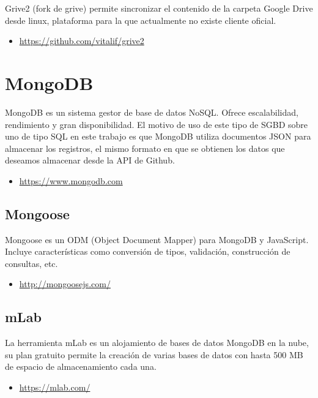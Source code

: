 Grive2 (fork de grive) permite sincronizar el contenido de la carpeta Google Drive desde linux, plataforma para la que actualmente no existe cliente oficial.

\begin{itemize}
	\item \url{https://github.com/vitalif/grive2}
\end{itemize}

\section{MongoDB}

MongoDB es un sistema gestor de base de datos NoSQL. Ofrece escalabilidad, rendimiento y gran disponibilidad. El motivo de uso de este tipo de SGBD sobre uno de tipo SQL en este trabajo es que MongoDB utiliza documentos JSON para almacenar los registros, el mismo formato en que se obtienen los datos que deseamos almacenar desde la API de Github.

\begin{itemize}
	\item \url{https://www.mongodb.com}
\end{itemize}

\subsection{Mongoose}

Mongoose es un ODM (Object Document Mapper) para MongoDB y JavaScript. Incluye características como conversión de tipos, validación, construcción de consultas, etc.

\begin{itemize}
	\item \url{http://mongoosejs.com/}
\end{itemize}

\subsection{mLab}

La herramienta mLab es un alojamiento de bases de datos MongoDB en la nube, su plan gratuito permite la creación de varias bases de datos con hasta 500 MB de espacio de almacenamiento cada una.

\begin{itemize}
	\item \url{https://mlab.com/}
\end{itemize}

